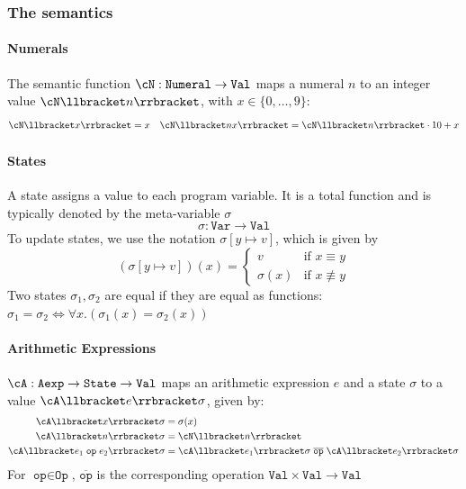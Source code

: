 \newpage
\subsubsection{The semantics}
\paragraph{Numerals}
The semantic function $\cN : \texttt{Numeral} \rightarrow \texttt{Val}$ maps a numeral $n$ to an integer value $\cN\llbracket n \rrbracket$,
with $x \in \{ 0, \ldots, 9 \}$:
\begin{align*}
    \cN\llbracket x \rrbracket = x &  & \cN\llbracket n x \rrbracket = \cN\llbracket n \rrbracket \cdot 10 + x
\end{align*}


\paragraph{States}
A state assigns a value to each program variable. It is a total function and is typically denoted by the meta-variable $\sigma$
\[
    \sigma : \texttt{Var} \rightarrow \texttt{Val}
\]
To update states, we use the notation $\sigma[y \mapsto v]$, which is given by
\[
    (\sigma[y \mapsto v])(x) = \begin{cases}
        v         & \text{if } x \equiv y     \\
        \sigma(x) & \text{if } x \not\equiv y
    \end{cases}
\]
Two states $\sigma_1, \sigma_2 $ are equal if they are equal as functions: $\sigma_1 = \sigma_2 \Leftrightarrow \forall x. (\sigma_1(x) = \sigma_2(x))$


\paragraph{Arithmetic Expressions}
$\cA : \texttt{Aexp} \rightarrow \texttt{State} \rightarrow \texttt{Val}$ maps an arithmetic expression $e$ and a state $\sigma$ to a value $\cA\llbracket e \rrbracket \sigma$,
given by:
\begin{align*}
    \cA\llbracket x \rrbracket \sigma                         & = \sigma(x)                                                                                            \\
    \cA\llbracket n \rrbracket \sigma                         & = \cN\llbracket n \rrbracket                                                                           \\
    \cA\llbracket e_1 \; \texttt{op} \; e_2 \rrbracket \sigma & = \cA\llbracket e_1 \rrbracket \sigma \; \overline{\texttt{op}} \; \cA\llbracket e_2 \rrbracket \sigma
\end{align*}
For $\texttt{op} \in \texttt{Op}$, $\overline{\texttt{op}}$ is the corresponding operation $\texttt{Val} \times \texttt{Val} \rightarrow \texttt{Val}$


